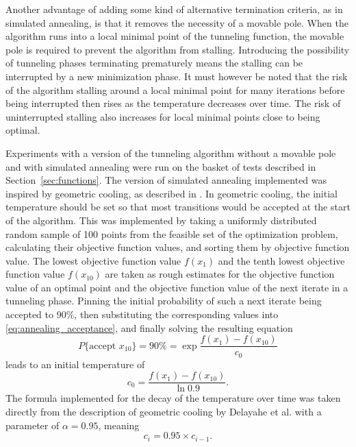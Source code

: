 \documentclass[a4paper,12pt,twoside]{article}
\begin{document}
Another advantage of adding some kind of alternative termination criteria, as in simulated annealing, is that it removes the necessity of a movable pole. When the algorithm runs into a local minimal point of the tunneling function, the movable pole is required to prevent the algorithm from stalling. Introducing the possibility of tunneling phases terminating prematurely means the stalling can be interrupted by a new minimization phase. It must however be noted that the risk of the algorithm stalling around a local minimal point for many iterations before being interrupted then rises as the temperature decreases over time. The risk of uninterrupted stalling also increases for local minimal points close to being optimal.

Experiments with a version of the tunneling algorithm without a movable pole and with simulated annealing were run \cite{heidbrink_nicolasheidbrinkoptimization-seminar_2026} on the basket of tests described in Section~\ref{sec:functions}. The version of simulated annealing implemented was inspired by geometric cooling, as described in \cite[\S 1.4.2]{delahaye_simulated_2019}. In geometric cooling, the initial temperature should be set so that most transitions would be accepted at the start of the algorithm. This was implemented by taking a uniformly distributed random sample of 100 points from the feasible set of the optimization problem, calculating their objective function values, and sorting them by objective function value. The lowest objective function value $f(x_1)$ and the tenth lowest objective function value $f(x_{10})$ are taken as rough estimates for the objective function value of an optimal point and the objective function value of the next iterate in a tunneling phase. Pinning the initial probability of such a next iterate being accepted to $90\%$, then substituting the corresponding values into \ref{eq:annealing_acceptance}, and finally solving the resulting equation
\[
P\{\text{accept } x_{10}\} = 90\% = \exp{\frac{f(x_1) - f(x_{10})}{c_0}}
\]
leads to an initial temperature of 
\[
c_0 = \frac{f(x_1) - f(x_{10})}{\ln{0.9}}.
\]
The formula implemented for the decay of the temperature over time was taken directly from the description of geometric cooling by Delayahe et al. with a parameter of $\alpha = 0.95$, meaning
\[
c_i = 0.95 \times c_{i-1}.
\]
\end{document}
